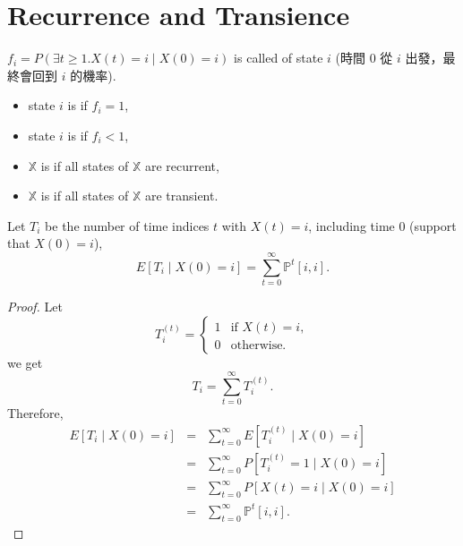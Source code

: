 \section{Recurrence and Transience}

\begin{definition}
$ f_{i} = P(\exists t \ge 1. X(t) = i \mid X(0) = i) $ is called  of state $ i $ {\small \color{gray} (時間 $ 0 $ 從 $ i $ 出發，最終會回到 $ i $ 的機率)}.
\begin{itemize}
  \item state $ i $ is  if $ f_{i} = 1 $,
  \item state $ i $ is  if $ f_{i} < 1 $,
  \item $ \mathbb{X} $ is  if all states of $ \mathbb{X} $ are recurrent,
  \item $ \mathbb{X} $ is  if all states of $ \mathbb{X} $ are transient.
\end{itemize}
\end{definition}

\begin{observation}
Let $ T_{i} $ be the number of time indices $ t $ with $ X(t) = i $, including time $ 0 $ (support that $ X(0) = i $),
\[ E[T_{i} \mid X(0) = i] = \sum_{t = 0}^{\infty} \mathbb{P}^{t}[i, i]. \]

\begin{proof}
Let
\[
T^{(t)}_{i} =
  \begin{cases}
    1 & \text{if } X(t) = i, \\
    0 & \text{otherwise.}
  \end{cases}
\]
we get
\[ T_{i} = \sum_{t = 0}^{\infty} T^{(t)}_{i}. \]
Therefore,
\begin{eqnarray*}
E[T_{i} \mid X(0) = i]
  & = & \sum_{t = 0}^{\infty} E[T^{(t)}_{i} \mid X(0) = i] \\
  & = & \sum_{t = 0}^{\infty} P[T^{(t)}_{i} = 1 \mid X(0) = i] \\
  & = & \sum_{t = 0}^{\infty} P[X(t) = i \mid X(0) = i] \\
  & = & \sum_{t = 0}^{\infty} \mathbb{P}^{t}[i, i].
\end{eqnarray*}
\end{proof}
\end{observation}

